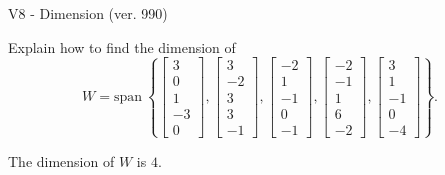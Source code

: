 \begin{exercise}
  \begin{exerciseTitle}V8 - Dimension (ver. 990)\end{exerciseTitle}
  \begin{exerciseStatement}
    Explain how to find the dimension of 
\[W=\mathrm{span}\ \left\{\left[\begin{array}{r}
3 \\
0 \\
1 \\
-3 \\
0
\end{array}\right] , \left[\begin{array}{r}
3 \\
-2 \\
3 \\
3 \\
-1
\end{array}\right] , \left[\begin{array}{r}
-2 \\
1 \\
-1 \\
0 \\
-1
\end{array}\right] , \left[\begin{array}{r}
-2 \\
-1 \\
1 \\
6 \\
-2
\end{array}\right] , \left[\begin{array}{r}
3 \\
1 \\
-1 \\
0 \\
-4
\end{array}\right]\right\}.\]



  \end{exerciseStatement}
  \begin{exerciseAnswer}
   The dimension of \(W\) is  \(4\).
  


  \end{exerciseAnswer}
\end{exercise}